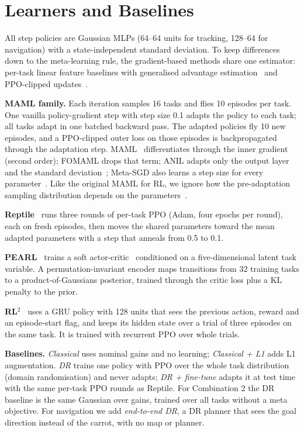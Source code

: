 \section{Learners and Baselines}\label{sec:learners}

All step policies are Gaussian MLPs (64--64 units for tracking, 128--64 for navigation) with a state-independent standard deviation. To keep differences down to the meta-learning rule, the gradient-based methods share one estimator: per-task linear feature baselines with generalised advantage estimation~\cite{schulman2015gae} and PPO-clipped updates~\cite{schulman2017ppo}.

\textbf{MAML family.} Each iteration samples 16 tasks and flies 10 episodes per task. One vanilla policy-gradient step with step size 0.1 adapts the policy to each task; all tasks adapt in one batched backward pass. The adapted policies fly 10 new episodes, and a PPO-clipped outer loss on those episodes is backpropagated through the adaptation step. MAML~\cite{finn2017maml} differentiates through the inner gradient (second order); FOMAML drops that term; ANIL adapts only the output layer and the standard deviation~\cite{raghu2020anil}; Meta-SGD also learns a step size for every parameter~\cite{li2017metasgd}. Like the original MAML for RL, we ignore how the pre-adaptation sampling distribution depends on the parameters~\cite{rothfuss2018promp}.

\textbf{Reptile}~\cite{nichol2018reptile} runs three rounds of per-task PPO (Adam, four epochs per round), each on fresh episodes, then moves the shared parameters toward the mean adapted parameters with a step that anneals from 0.5 to 0.1.

\textbf{PEARL}~\cite{rakelly2019pearl} trains a soft actor-critic~\cite{haarnoja2018sac} conditioned on a five-dimensional latent task variable. A permutation-invariant encoder maps transitions from 32 training tasks to a product-of-Gaussians posterior, trained through the critic loss plus a KL penalty to the prior.

\textbf{RL$^2$}~\cite{duan2016rl2,wang2016learning} uses a GRU policy with 128 units that sees the previous action, reward and an episode-start flag, and keeps its hidden state over a trial of three episodes on the same task. It is trained with recurrent PPO over whole trials.

\textbf{Baselines.} \emph{Classical} uses nominal gains and no learning; \emph{Classical + L1} adds L1 augmentation. \emph{DR} trains one policy with PPO over the whole task distribution (domain randomisation) and never adapts; \emph{DR + fine-tune} adapts it at test time with the same per-task PPO rounds as Reptile. For Combination 2 the DR baseline is the same Gaussian over gains, trained over all tasks without a meta objective. For navigation we add \emph{end-to-end DR}, a DR planner that sees the goal direction instead of the carrot, with no map or planner.

